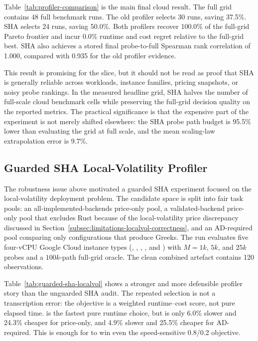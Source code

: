 Table~\ref{tab:profiler-comparison} is the main final cloud result. The full
grid contains 48 full benchmark runs. The old profiler selects 30 runs, saving
37.5\%. SHA selects 24 runs, saving 50.0\%. Both profilers recover 100.0\% of
the full-grid Pareto frontier and incur 0.0\% runtime and cost regret relative
to the full-grid best. SHA also achieves a stored final probe-to-full Spearman
rank correlation of 1.000, compared with 0.935 for the old profiler evidence.



This result is promising for the  slice, but it should not
be read as proof that SHA is generally reliable across workloads, instance
families, pricing snapshots, or noisy probe rankings. In the measured headline
grid, SHA halves the number of full-scale cloud benchmark cells while
preserving the full-grid decision quality on the reported metrics. The
practical significance is that the expensive part of the experiment is not
merely shifted elsewhere: the SHA probe path budget is 95.5\% lower than
evaluating the grid at full scale, and the mean scaling-law extrapolation
error is 9.7\%.

\subsection{Guarded SHA Local-Volatility Profiler}
\label{subsec:guarded-sha-localvol}

The robustness issue above motivated a guarded SHA experiment focused on the
local-volatility deployment problem. The candidate space is split into fair
task pools: an all-implemented-backends price-only pool, a validated-backend
price-only pool that excludes Rust because of the local-volatility price
discrepancy discussed in Section~\ref{subsec:limitations-localvol-correctness}, and an
AD-required pool comparing only configurations that produce Greeks. The run
evaluates five four-vCPU Google Cloud instance types
(, , , , and ) with \(M=1k\),
\(5k\), and \(25k\) probes and a \(100k\)-path full-grid oracle. The clean
combined artefact contains 120 observations.



Table~\ref{tab:guarded-sha-localvol} shows a stronger and more defensible
profiler story than the unguarded SHA audit. The repeated  selection
is not a transcription error: the objective is a weighted runtime--cost score,
not pure elapsed time.  is the fastest pure runtime choice, but
 is only 6.0\% slower and 24.3\% cheaper for price-only, and 4.9\%
slower and 25.5\% cheaper for AD-required. This is enough for  to win
even the speed-sensitive 0.8/0.2 objective.

